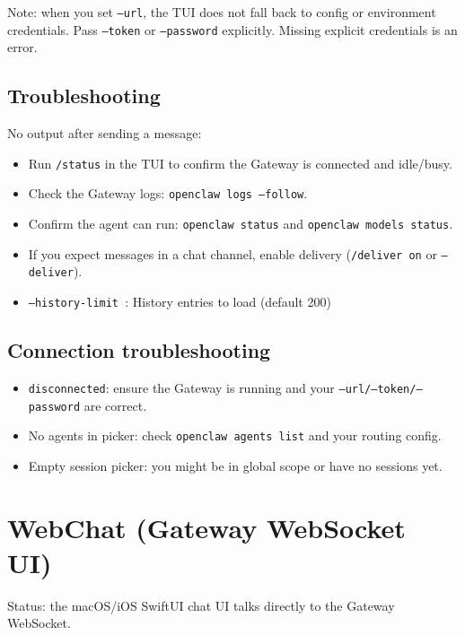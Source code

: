 Note: when you set \texttt{--url}, the TUI does not fall back to config or environment credentials.
Pass \texttt{--token} or \texttt{--password} explicitly. Missing explicit credentials is an error.

\subsection{Troubleshooting}


No output after sending a message:

\begin{itemize}
  \item Run \texttt{/status} in the TUI to confirm the Gateway is connected and idle/busy.
  \item Check the Gateway logs: \texttt{openclaw logs --follow}.
  \item Confirm the agent can run: \texttt{openclaw status} and \texttt{openclaw models status}.
  \item If you expect messages in a chat channel, enable delivery (\texttt{/deliver on} or \texttt{--deliver}).
  \item \texttt{--history-limit }: History entries to load (default 200)
\end{itemize}


\subsection{Connection troubleshooting}


\begin{itemize}
  \item \texttt{disconnected}: ensure the Gateway is running and your \texttt{--url/--token/--password} are correct.
  \item No agents in picker: check \texttt{openclaw agents list} and your routing config.
  \item Empty session picker: you might be in global scope or have no sessions yet.
\end{itemize}



\clearpage

\section{WebChat (Gateway WebSocket UI)}


Status: the macOS/iOS SwiftUI chat UI talks directly to the Gateway WebSocket.

